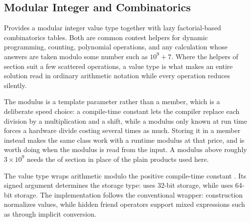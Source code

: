 \subsection{Modular Integer and Combinatorics}
\label{sec:6.3.3}
Provides a modular integer value type together with lazy factorial-based combinatorics tables. Both are common contest helpers for dynamic programming, counting, polynomial operations, and any calculation whose answers are taken modulo some number such as $10^9 + 7$. Where the helpers of section  suit a few scattered operations, a value type is what makes an entire solution read in ordinary arithmetic notation while every operation reduces silently.

The modulus is a template parameter rather than a member, which is a deliberate speed choice: a compile-time constant lets the compiler replace each division by a multiplication and a shift, while a modulus only known at run time forces a hardware divide costing several times as much. Storing it in a  member instead makes the same class work with a runtime modulus at that price, and is worth doing when the modulus is read from the input. A modulus above roughly $3 \times 10^9$ needs the  of section  in place of the plain products used here.

The  value type wraps arithmetic modulo the positive compile-time constant . Its signed  argument determines the storage type:  uses 32-bit storage, while  uses 64-bit storage. The implementation follows the conventional  wrapper: construction normalizes values, while hidden friend operators support mixed expressions such as  through implicit conversion.

